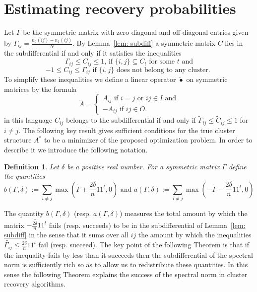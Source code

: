 \documentclass[12pt]{amsart}
\newtheorem{definition}{Definition}
\numberwithin{equation}{section}
\begin{document}
\section{Estimating recovery probabilities}

Let $\Gamma$ be the symmetric matrix with zero diagonal and off-diagonal entries given by
$\Gamma_{ij}=\frac{n_0(ij)-n_1(ij)}{N}$. By Lemma~\ref{lem: subdiff} a symmetric matrix $C$ lies in the subdifferential if and only if it satisfies the inequalities
\[ \Gamma_{ij}\leq C_{ij}\leq 1 \text{, if $\{i,j\}\subseteq C_t$ for some $t$ and}\]
\[-1\leq C_{ij} \leq \Gamma_{ij} \text{ if $\{i,j\}$ does not belong to any cluster. } \]
To simplify these inequalities we define a linear operator $\widetilde{\bullet}$ on symmetric matrices by the formula
\[ \widetilde{A} = 
\begin{cases}
A_{ij}\text{ if $i=j$ or $ij\in I$ and}\\
-A_{ij}\text{ if $ij\in O$.}
\end{cases}
\]
in this language $C_{ij}$ belongs to the subdifferential if and only if $\widetilde{\Gamma}_{ij}\leq \widetilde{C}_{ij}\leq 1$ for $i\neq j$.
The following key result gives sufficient conditions for the true cluster structure $A^*$ to be a minimizer of the proposed optimization problem. In order to describe it we introduce the following notation. 

\begin{definition} Let $\delta$ be a positive real number. For a symmetric matrix $\Gamma$ define the quantities
\[b(\Gamma,\delta):=\sum_{i\neq j} \max\left(\widetilde{\Gamma}+\frac{2\delta}{n}11^t,0\right)
\text{ and } a(\Gamma,\delta):=\sum_{i\neq j} \max\left(-\widetilde{\Gamma}-\frac{2\delta}{n}11^t,0\right)
\]\end{definition}
The quantity $b(\Gamma,\delta)$ (resp. $a(\Gamma,\delta)$) measures the total amount by which the matrix $\widetilde{-\frac{2\delta}{n}11^t}$ fails (resp. succeeds) to be in the subdifferential of Lemma~\ref{lem: subdiff} in the sense that it sums over all $ij$ the amount by which the inequalities $\widetilde{\Gamma_{ij}}\leq \frac{2\delta}{n} 11^t$ fail (resp. succeed). The key point of the following Theorem is that if the inequality fails by less than it succeeds then the subdifferential of the spectral norm is sufficiently rich so as to allow us to redistribute these quantities. In this sense the following Theorem explains the success of the spectral norm in cluster recovery algorithms. 
\end{document}
